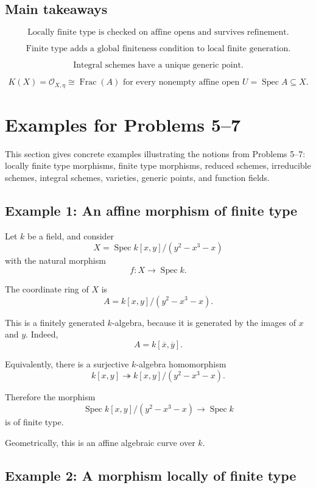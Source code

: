 \documentclass[12pt,a4paper]{article}
\DeclareMathOperator{\Spec}{Spec}
\newcommand{\OO}{\mathcal{O}}
\newcommand{\Frac}{\operatorname{Frac}}
\providecommand{\Spec}{\operatorname{Spec}}
\theoremstyle{notespace}
\begin{document}
\subsection{Main takeaways}

\[
\boxed{
	\text{Locally finite type is checked on affine opens and survives refinement.}
}
\]

\[
\boxed{
	\text{Finite type adds a global finiteness condition to local finite generation.}
}
\]

\[
\boxed{
	\text{Integral schemes have a unique generic point.}
}
\]

\[
\boxed{
	K(X)=\OO_{X,\eta}\cong \Frac(A)
	\text{ for every nonempty affine open } U=\Spec A\subseteq X.
}
\]
\section{Examples for Problems 5--7}

This section gives concrete examples illustrating the notions from Problems 5--7: locally finite type morphisms, finite type morphisms, reduced schemes, irreducible schemes, integral schemes, varieties, generic points, and function fields.

\subsection{Example 1: An affine morphism of finite type}

Let \(k\) be a field, and consider
\[
X=\operatorname{Spec} k[x,y]/(y^2-x^3-x)
\]
with the natural morphism
\[
f:X\to \operatorname{Spec} k.
\]

The coordinate ring of \(X\) is
\[
A=k[x,y]/(y^2-x^3-x).
\]

This is a finitely generated \(k\)-algebra, because it is generated by the images of \(x\) and \(y\). Indeed,
\[
A=k[\overline{x},\overline{y}].
\]

Equivalently, there is a surjective \(k\)-algebra homomorphism
\[
k[x,y]\twoheadrightarrow k[x,y]/(y^2-x^3-x).
\]

Therefore the morphism
\[
\operatorname{Spec} k[x,y]/(y^2-x^3-x)
\to
\operatorname{Spec} k
\]
is of finite type.

Geometrically, this is an affine algebraic curve over \(k\).

\subsection{Example 2: A morphism locally of finite type}
\end{document}
